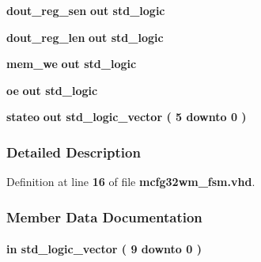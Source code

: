 \begin{DoxyCompactItemize}
{\bf dout\+\_\+reg\+\_\+sen}  {\bfseries {\bfseries \textcolor{keywordflow}{out}\textcolor{vhdlchar}{ }}} {\bfseries \textcolor{comment}{std\+\_\+logic}\textcolor{vhdlchar}{ }} 
\item 
{\bf dout\+\_\+reg\+\_\+len}  {\bfseries {\bfseries \textcolor{keywordflow}{out}\textcolor{vhdlchar}{ }}} {\bfseries \textcolor{comment}{std\+\_\+logic}\textcolor{vhdlchar}{ }} 
\item 
{\bf mem\+\_\+we}  {\bfseries {\bfseries \textcolor{keywordflow}{out}\textcolor{vhdlchar}{ }}} {\bfseries \textcolor{comment}{std\+\_\+logic}\textcolor{vhdlchar}{ }} 
\item 
{\bf oe}  {\bfseries {\bfseries \textcolor{keywordflow}{out}\textcolor{vhdlchar}{ }}} {\bfseries \textcolor{comment}{std\+\_\+logic}\textcolor{vhdlchar}{ }} 
\item 
{\bf stateo}  {\bfseries {\bfseries \textcolor{keywordflow}{out}\textcolor{vhdlchar}{ }}} {\bfseries \textcolor{comment}{std\+\_\+logic\+\_\+vector}\textcolor{vhdlchar}{ }\textcolor{vhdlchar}{(}\textcolor{vhdlchar}{ }\textcolor{vhdlchar}{ } \textcolor{vhdldigit}{5} \textcolor{vhdlchar}{ }\textcolor{keywordflow}{downto}\textcolor{vhdlchar}{ }\textcolor{vhdlchar}{ } \textcolor{vhdldigit}{0} \textcolor{vhdlchar}{ }\textcolor{vhdlchar}{)}\textcolor{vhdlchar}{ }} 
\end{DoxyCompactItemize}


\subsubsection{Detailed Description}


Definition at line {\bf 16} of file {\bf mcfg32wm\+\_\+fsm.\+vhd}.



\subsubsection{Member Data Documentation}
\paragraph[{address}]{ {\bfseries \textcolor{keywordflow}{in}\textcolor{vhdlchar}{ }} {\bfseries \textcolor{comment}{std\+\_\+logic\+\_\+vector}\textcolor{vhdlchar}{ }\textcolor{vhdlchar}{(}\textcolor{vhdlchar}{ }\textcolor{vhdlchar}{ } \textcolor{vhdldigit}{9} \textcolor{vhdlchar}{ }\textcolor{keywordflow}{downto}\textcolor{vhdlchar}{ }\textcolor{vhdlchar}{ } \textcolor{vhdldigit}{0} \textcolor{vhdlchar}{ }\textcolor{vhdlchar}{)}\textcolor{vhdlchar}{ }} \hspace{0.3cm}{\ttfamily [Port]}}\label{classmcfg32wm__fsm_ab8b1445c3b0b76cdcd30ba795be2bc45}


